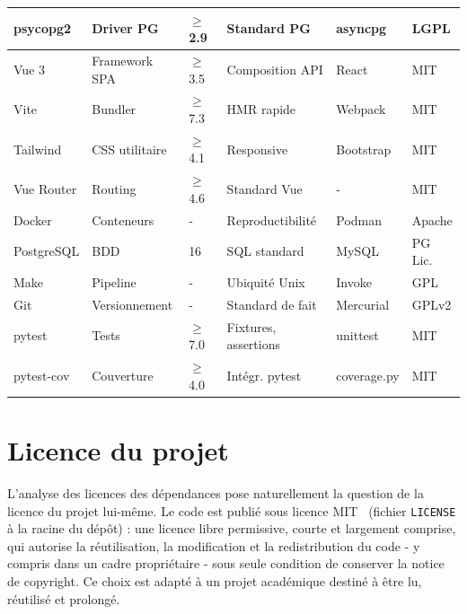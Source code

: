 \documentclass[12pt,a4paper,openany]{report}
\newcommand{\file}[1]{\texttt{#1}}
\begin{document}
{\begin{longtable}{R{2cm} R{2cm} R{1.2cm} R{3cm} R{2cm} R{1.2cm}}
    psycopg2      & Driver PG              & $\geq$2.9  & Standard PG          & asyncpg   & LGPL \\
    \midrule
    Vue 3         & Framework SPA          & $\geq$3.5  & Composition API      & React     & MIT \\
    Vite          & Bundler                & $\geq$7.3  & HMR rapide    & Webpack   & MIT \\
    Tailwind      & CSS utilitaire         & $\geq$4.1  & Responsive  & Bootstrap  & MIT \\
    Vue Router    & Routing                & $\geq$4.6  & Standard Vue                   & -               & MIT \\
    \midrule
    Docker        & Conteneurs             & -    & Reproductibilité   & Podman   & Apache \\
    PostgreSQL    & BDD                    & 16     & SQL standard       & MySQL    & PG Lic. \\
    Make          & Pipeline               & -    & Ubiquité Unix      & Invoke   & GPL \\
    Git           & Versionnement          & -    & Standard de fait   & Mercurial & GPLv2 \\
    \midrule
    pytest        & Tests                  & $\geq$7.0  & Fixtures, assertions   & unittest   & MIT \\
    pytest-cov    & Couverture             & $\geq$4.0  & Intégr. pytest    & coverage.py & MIT \\
\end{longtable}
}

\section{Licence du projet}

L'analyse des licences des dépendances pose naturellement la question de la licence du projet lui-même. Le code est publié sous licence MIT~\cite{mit-license} (fichier \file{LICENSE} à la racine du dépôt) : une licence libre permissive, courte et largement comprise, qui autorise la réutilisation, la modification et la redistribution du code - y compris dans un cadre propriétaire - sous seule condition de conserver la notice de copyright. Ce choix est adapté à un projet académique destiné à être lu, réutilisé et prolongé.
\end{document}
